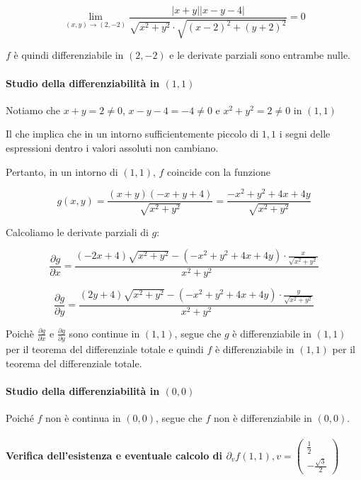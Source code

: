 \documentclass{article}
\begin{document}
\[
\lim_{(x,y) \to (2,-2)} \frac{|x+y||x-y-4|}{\sqrt{x^2 + y^2} \cdot \sqrt{{(x - 2)}^2 + {(y + 2)}^2}} = 0
\]

\(f\) è quindi differenziabile in \((2,-2)\) e le derivate parziali sono entrambe nulle.

\paragraph{Studio della differenziabilità in \((1, 1)\)}

Notiamo che \(x+y = 2 \neq 0\), \(x-y-4 = -4 \neq 0\) e \(x^2 + y^2 = 2 \neq 0\) in \((1,1)\)

Il che implica che in un intorno sufficientemente piccolo di \(1,1\) i segni delle espressioni dentro i valori assoluti non cambiano.

Pertanto, in un intorno di \((1,1)\), \(f\) coincide con la funzione 

\[
g(x,y) = \frac{(x+y)(-x+y+4)}{\sqrt{x^2 + y^2}} = \frac{-x^2 + y^2 + 4x + 4y}{\sqrt{x^2 + y^2}}
\]

Calcoliamo le derivate parziali di \(g\):

\[
\frac{\partial g}{\partial x} = \frac{(-2x+4)\sqrt{x^2 + y^2} - (-x^2 + y^2 + 4x + 4y)\cdot \frac{x}{\sqrt{x^2 + y^2}}}{x^2+y^2}
\]

\[
\frac{\partial g}{\partial y} = \frac{(2y+4)\sqrt{x^2 + y^2} - (-x^2 + y^2 + 4x + 4y)\cdot \frac{y}{\sqrt{x^2 + y^2}}}{x^2+y^2}
\]

Poichè \(\frac{\partial g}{\partial x}\) e \(\frac{\partial g}{\partial y}\) sono continue in \((1,1)\), segue che \(g\) è differenziabile in \((1,1)\) per il teorema del differenziale totale e quindi \(f\) è differenziabile in \((1,1)\) per il teorema del differenziale totale.

\paragraph{Studio della differenziabilità in \((0,0)\)} Poiché \(f\) non è continua in \((0,0)\), segue che \(f\) non è differenziabile in \((0,0)\).

\paragraph{Verifica dell'esistenza e eventuale calcolo di \(\partial_v f(1,1), v = \begin{pmatrix} \frac{1}{2} \\ -\frac{\sqrt{3}}{2}\end{pmatrix}\)}
\end{document}
